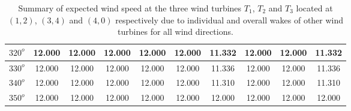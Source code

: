\begin{table}[H]
\begin{tabular}{|c|c|c|c|c|c|c|c|c|c|}
	         \hline
	         $320^{o}$ & 12.000 & 12.000 & 12.000 & 12.000 & 12.000 & 11.332 & 12.000& 12.000 & 11.332  \\
	         \hline
	         $330^{o}$ & 12.000 & 12.000 & 12.000 & 12.000 & 12.000 & 11.336 & 12.000& 12.000 & 11.336  \\
	         \hline
	         $340^{o}$ & 12.000 & 12.000 & 12.000 & 12.000 & 12.000 & 11.310 & 12.000& 12.000 & 11.310  \\
	         \hline
	         $350^{o}$ & 12.000 & 12.000 & 12.000 & 12.000 & 12.000 & 12.000 & 12.000& 12.000 & 12.000  \\
	         \hline
	         
	    \end{tabular}
	    
	    \caption{Summary of expected wind speed at the three wind turbines $T_1$, $T_2$ and $T_3$ located at $(1,2)$, $(3,4)$ and $(4,0)$ respectively due to individual and overall wakes of other wind turbines for all wind directions.}
	    \label{summaryRandom3-3a}
	\end{table}
	\doublespacing
	
